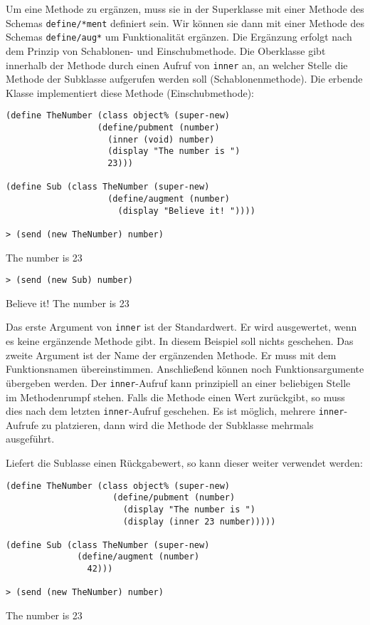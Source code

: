 Um eine Methode zu ergänzen, muss sie in der Superklasse mit einer Methode des Schemas \texttt{define/*ment} definiert sein. Wir können sie dann mit einer Methode des Schemas \texttt{define/aug*} um Funktionalität ergänzen. Die Ergänzung erfolgt nach dem Prinzip von Schablonen- und Einschubmethode. Die Oberklasse gibt innerhalb der Methode durch einen Aufruf von \texttt{inner} an, an welcher Stelle die Methode der Subklasse aufgerufen werden soll (Schablonenmethode). Die erbende Klasse implementiert diese Methode (Einschubmethode):

\begin{lstlisting}
(define TheNumber (class object% (super-new)
                  (define/pubment (number)
                    (inner (void) number)
                    (display "The number is ")
                    23)))

(define Sub (class TheNumber (super-new)
                    (define/augment (number)
                      (display "Believe it! "))))
                      
> (send (new TheNumber) number)
\end{lstlisting}
{\routput The number is 23}

\begin{lstlisting}                
> (send (new Sub) number)
\end{lstlisting}
{\routput Believe it! The number is 23}

Das erste Argument von \texttt{inner} ist der Standardwert. Er wird ausgewertet, wenn es keine ergänzende Methode gibt. In diesem Beispiel soll nichts geschehen. Das zweite Argument ist der Name der ergänzenden Methode. Er muss mit dem Funktionsnamen übereinstimmen. Anschließend können noch Funktionsargumente übergeben werden. Der \texttt{inner}-Aufruf kann prinzipiell an einer beliebigen Stelle im Methodenrumpf stehen. Falls die Methode einen Wert zurückgibt, so muss dies nach dem letzten \texttt{inner}-Aufruf geschehen. Es ist möglich, mehrere \texttt{inner}-Aufrufe zu platzieren, dann wird die Methode der Subklasse mehrmals ausgeführt. 

Liefert die Sublasse einen Rückgabewert, so kann dieser weiter verwendet werden:

\begin{lstlisting}
(define TheNumber (class object% (super-new)
                     (define/pubment (number)
                       (display "The number is ")
                       (display (inner 23 number)))))

(define Sub (class TheNumber (super-new)
              (define/augment (number)
                42)))

> (send (new TheNumber) number)
\end{lstlisting}
{\routput The number is 23}

